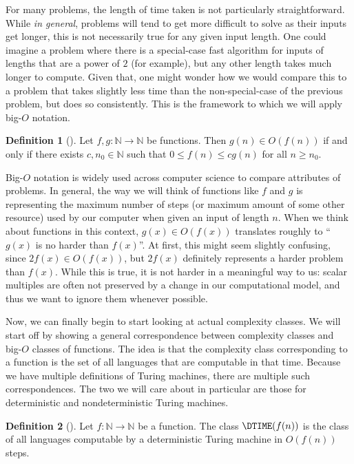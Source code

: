 \documentclass[english,12pt]{reedthesis}
\theoremstyle{plain}
\theoremstyle{definition}
\newtheorem{defn}[defn]{Definition}
\theoremstyle{remark}
\begin{document}
For many problems, the length of time taken is not particularly straightforward.
While \emph{in general}, problems will tend to get more difficult to solve as
their inputs get longer, this is not necessarily true for any given input
length. One could imagine a problem where there is a special-case fast algorithm
for inputs of lengths that are a power of $2$ (for example), but any other
length takes much longer to compute. Given that, one might wonder how we would
compare this to a problem that takes slightly less time than the
non-special-case of the previous problem, but does so consistently. This is the
framework to which we will apply big-$O$ notation.

\begin{defn}[{\cite[47]{CLRS}}]\label{O-notation@$O$-notation}
  Let $f, g\colon \mathbb{N} \rightarrow \mathbb{N}$ be functions. Then $g(n) \in O(f(n))$ if and only if
  there exists $c, n_{0} \in \mathbb{N}$ such that $0 \le f(n) \le cg(n)$ for all $n \ge n_{0}$.
\end{defn}

Big-$O$ notation is widely used across computer science to compare attributes of
problems. In general, the way we will think of functions like $f$ and $g$ is
representing the maximum number of steps (or maximum amount of some other
resource) used by our computer when given an input of length $n$. When we think
about functions in this context, $g(x) \in O(f(x))$ translates roughly to ``$g(x)$
is no harder than $f(x)$''. At first, this might seem slightly confusing, since
$2f(x) \in O(f(x))$, but $2f(x)$ definitely represents a harder problem than
$f(x)$. While this is true, it is not harder in a meaningful way to us: scalar
multiples are often not preserved by a change in our computational model, and
thus we want to ignore them whenever possible.

Now, we can finally begin to start looking at actual complexity classes. We will
start off by showing a general correspondence between complexity classes and
big-$O$ classes of functions. The idea is that the complexity class
corresponding to a function is the set of all languages that are computable in
that time. Because we have multiple definitions of Turing machines, there are
multiple such correspondences. The two we will care about in particular are
those for deterministic and nondeterministic Turing machines.

\begin{defn}[{\cite[Def.\ 1.19]{AB09}}]\label{def:dtime}
  Let $f\colon \mathbb{N} \rightarrow \mathbb{N}$ be a function. The class $\DTIME(f(n))$ is the class of
  all languages computable by a deterministic Turing machine in $O(f(n))$ steps.
\end{defn}
\end{document}
